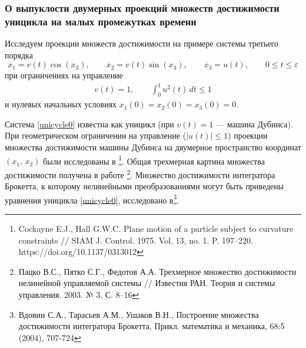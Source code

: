 \documentclass[../main.tex]{subfiles}
\begin{document}
\subsubsection{О выпуклости двумерных проекций множеств достижимости уницикла на малых промежутках времени}	
	Исследуем проекции множеств достижимости на примере системы третьего порядка
	\begin{equation}\label{unicycle0}
		\dot{x_1} = v(t)\cos(x_3), \qquad
		\dot{x_2} = v(t)\sin(x_3), \qquad
		\dot{x_3} = u(t), \qquad 0 \leq t \leq \varepsilon
	\end{equation}
	при ограничениях на управление 
	\begin{gather*}
		v(t) = 1, \qquad \int_0^1 u^2(t) \, dt \leqslant 1
	\end{gather*}
	и нулевых начальных условиях $ x_1(0) = x_2(0) = x_3(0) = 0 $.
	
	Система \eqref{unicycle0} известна как уницикл (при $ v(t) = 1$  --- машина Дубинса). При геометрическом
	ограничении на
	управление ($|u(t)|\leq 1$) проекции множества достижимости  машины Дубинса  на двумерное пространство координат $(x_1,\,x_2)$ были исследованы в
	\footnote{Cockayne E.J., Hall G.W.C. Plane motion of a particle subject to curvature constraints // SIAM J. Control. 1975. Vol. 13, no. 1. P. 197--220.  https://doi.org/10.1137/0313012}. Общая трехмерная картина множества достижимости  получена в
	работе  \footnote{Пацко В.С., Пятко С.Г., Федотов А.А. Трехмерное множество достижимости нелинейной управляемой системы // Известия РАН. Теория и системы управления. 2003. № 3. С. 8--16}. Множество достижимости интегратора Брокетта, к которому нелинейными преобразованиями могут быть приведены уравнения уницикла \eqref{unicycle0}, исследовано в\footnote{Вдовин С.А., Тарасьев А.М., Ушаков В.Н., Построение множества достижимости интегратора Брокетта, Прикл. математика и механика, 68:5 (2004), 707-724}.
	
\end{document}

